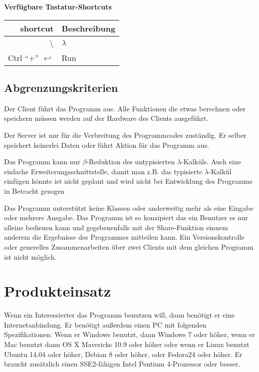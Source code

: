 \documentclass[parskip=full,11pt,twoside]{scrartcl}
\begin{document}
\textbf{Verfügbare Tastatur-Shortcuts}

\begin{tabular}{|r|l|}
    
    \hline 
    shortcut & Beschreibung \\ \hline
    \textbackslash & $\lambda$ \\ \hline
    Ctrl \enquote{+} $\hookleftarrow$ & Run \\ \hline
    
\end{tabular}


\subsection{Abgrenzungskriterien}

Der Client führt das Programm aus. Alle Funktionen die etwas berechnen oder speichern müssen werden auf der Hardware des Clients ausgeführt.

Der Server ist nur für die Verbreitung des Programmcodes zuständig. Er selber speichert keinerlei Daten oder führt Aktion für das Programm aus.

Das Programm kann nur $\beta$-Reduktion des untypisierten $\lambda$-Kalküls. Auch eine einfache Erweiterungsschnittstelle, damit man z.B. das typisierte $\lambda$-Kalkül einfügen könnte ist nicht geplant und wird nicht bei Entwicklung des Programms in Betracht gezogen

Das Programm unterstützt keine Klassen oder anderweitig mehr als eine Eingabe oder mehrere Ausgabe.
Das Programm ist so konzipiert das ein Benutzer es nur alleine bedienen kann und gegebenenfalls mit der Share-Funktion einnem anderem die Ergebnisse des Programmes mitteilen kann. Ein Versionskontrolle oder generelles Zusammenarbeiten über zwei Clients mit dem gleichen Programm ist nicht möglich.



\newpage
\section{Produkteinsatz}

Wenn ein Interessierter das Programm benutzen will, dann benötigt er eine Internetanbindung. Er benötigt  außerdem einen PC mit folgenden Spezifikationen: Wenn er Windows benutzt, dann Windows 7 oder höher, wenn er Mac benutzt dann OS X Mavericks 10.9 oder höher oder wenn er Linux benutzt Ubuntu 14.04 oder höher, Debian 8 oder höher, oder Fedora24 oder höher.
Er braucht zusätzlich einen SSE2-fähigen Intel Pentium 4-Prozessor oder besser.
\end{document}
